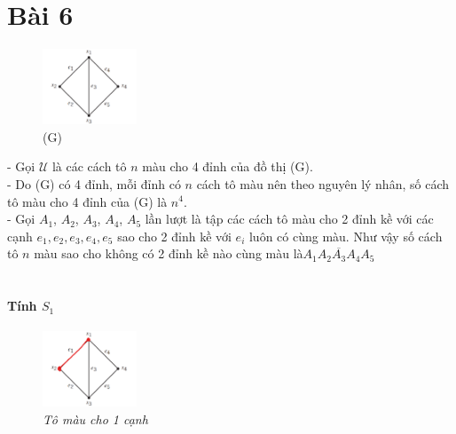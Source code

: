 \documentclass[main.tex]{subfiles}
\begin{document}
\section{Bài 6}

\newcommand{\U}{\ensuremath{\mathcal U} }
\newcommand{\A}[1]{\ensuremath{A_{#1}}}
\newcommand{\x}[1]{\ensuremath{x_{#1}}}
\newcommand{\abs}[1]{\ensuremath{\left|#1\right|}}
\newcommand{\ssum}[3]{\sum_{#1}^{#2}{#3}}
\newcommand{\vv}{\dots}

\begin{figure}
\centering
\includegraphics[width=0.25\textwidth]{image/Bai6.png}
\captionsetup{labelformat=empty}
\caption{(G)}
\vspace*{-1cm}
\end{figure}

- Gọi \U là các cách tô $n$ màu cho 4 đỉnh của đồ thị (G).\\
- Do (G) có 4 đỉnh, mỗi đỉnh có $n$ cách tô màu nên theo nguyên lý nhân, số cách tô màu cho 4 đỉnh của (G) là $n^4$.\\
- Gọi \A 1, \A 2, \A 3, \A 4, \A 5 lần lượt là tập các cách tô màu cho 2 đỉnh kề với các cạnh $e_1, e_2, e_3, e_4, e_5$ sao cho 2 đỉnh kề với $e_i$ luôn có cùng màu. Như vậy số cách tô $n$ màu sao cho không có 2 đỉnh kề nào cùng màu là$\overline{\A1\A2\A3\A4\A5}$\\ \\

\paragraph*{Tính $S_1$}
\begin{figure}
\centering
\vspace*{-1cm}
\includegraphics[width=0.25\textwidth]{image/Bai6_S1.png}
\captionsetup{labelformat=empty}
\caption{\textit{Tô màu cho 1 cạnh}}
\vspace*{-1cm}
\end{figure}
\end{document}
